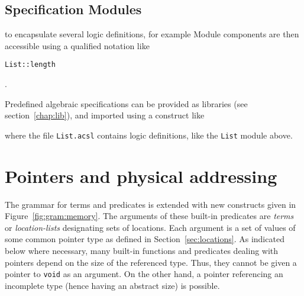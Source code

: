 \subsection{Specification Modules}
\label{sec:specmodules}

\experimental


 to encapsulate
several logic definitions, for example
Module components are then accessible using a qualified notation like
\begin{notimplementedenv}\lstinline|List::length|\end{notimplementedenv}.


Predefined algebraic specifications can be provided as
libraries (see
section~\ref{chap:lib}), and imported using a construct like
\begin{notimplementedenv}
\end{notimplementedenv}
where the file \lstinline|List.acsl| contains logic
definitions, like the \lstinline|List| module above.




\section{Pointers and physical addressing}
\label{sec:pointers}
The grammar for terms and predicates is
extended with new constructs given in Figure~\ref{fig:gram:memory}.
The arguments of these built-in predicates are \textsl{terms} or \textsl{location-lists} designating sets of locations.
Each argument is a set of values of some common pointer type as defined in Section~\ref{sec:locations}. As indicated below where necessary,
many built-in functions and predicates dealing with
pointers depend on the size of the referenced type. Thus, they cannot be given
a pointer to \lstinline|void| as an argument. On the
other hand, a pointer referencing an incomplete type (hence having an
abstract size) is possible.

